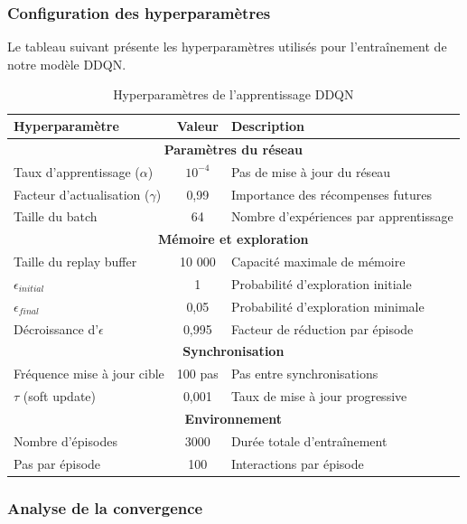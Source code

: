 \subsubsection{Configuration des hyperparamètres}
Le tableau suivant présente les hyperparamètres utilisés pour l'entraînement de notre modèle DDQN.
\begin{table}[H] 
	\centering
	\caption{Hyperparamètres de l'apprentissage DDQN}
	\label{tab:hyperparameters}
	\begin{tabular}{|l|c|l|}
		\hline
		\textbf{Hyperparamètre} & \textbf{Valeur} & \textbf{Description} \\
		\hline
		\multicolumn{3}{|c|}{\textbf{Paramètres du réseau}} \\
		\hline
		Taux d'apprentissage ($\alpha$) & $10^{-4}$ & Pas de mise à jour du réseau \\
		Facteur d'actualisation ($\gamma$) & 0,99 & Importance des récompenses futures \\
		Taille du batch & 64 & Nombre d'expériences par apprentissage \\
		\hline
		\multicolumn{3}{|c|}{\textbf{Mémoire et exploration}} \\
		\hline
		Taille du replay buffer & 10 000 & Capacité maximale de mémoire \\
		$\epsilon_{initial}$ & 1 & Probabilité d'exploration initiale \\
		$\epsilon_{final}$ & 0,05 & Probabilité d'exploration minimale \\
		Décroissance d'$\epsilon$ & 0,995 & Facteur de réduction par épisode \\
		\hline
		\multicolumn{3}{|c|}{\textbf{Synchronisation}} \\
		\hline
		Fréquence mise à jour cible & 100 pas & Pas entre synchronisations \\
		$\tau$ (soft update) & 0,001 & Taux de mise à jour progressive \\
		\hline
		\multicolumn{3}{|c|}{\textbf{Environnement}} \\
		\hline
		Nombre d'épisodes & 3000 & Durée totale d'entraînement \\
		Pas par épisode & 100 & Interactions par épisode \\
		\hline
	\end{tabular}
\end{table}	

\subsubsection{Analyse de la convergence}

